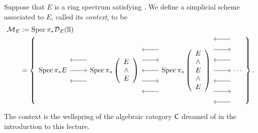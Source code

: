 \begin{definition}
Suppose that $E$ is a ring spectrum satisfying {\CH}.  We define a simplicial scheme associated to $E$, called its \textit{context}, to be
\begin{align*}
\mathcal{M}_E & := \Spec \pi_* \sheaf D_E(\S) \\
& = \left\{
\begin{tikzcd}[ampersand replacement=\&]
\Spec \pi_* E \arrow{r} \arrow[leftarrow,shift left=\baselineskip]{r} \arrow[leftarrow,shift right=\baselineskip]{r} \&
\Spec \pi_* \left( \begin{array}{c} E \\ \sm \\ E \end{array} \right) \arrow[leftarrow, shift left=(2*\baselineskip)]{r} \arrow[shift left=\baselineskip]{r} \arrow[leftarrow]{r} \arrow[shift right=\baselineskip]{r} \arrow[leftarrow, shift right=(2*\baselineskip)]{r} \&
\Spec \pi_* \left( \begin{array}{c} E \\ \sm \\ E \\ \sm \\ E \end{array} \right) \arrow[leftarrow, shift left=(3*\baselineskip)]{r} \arrow[shift left=(2*\baselineskip)]{r} \arrow[leftarrow, shift left=\baselineskip]{r} \arrow{r} \arrow[leftarrow, shift right=\baselineskip]{r} \arrow[shift right=(2*\baselineskip)]{r} \arrow[leftarrow, shift right=(3*\baselineskip)]{r} \&
\cdots
\end{tikzcd}
\right\}.
\end{align*}
\end{definition}

The context is the wellspring of the algebraic category $\mathsf{C}$ dreamed of in the introduction to this lecture.

